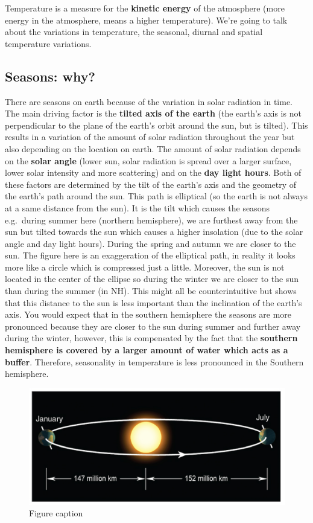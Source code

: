 \documentclass[oneside]{book}
\begin{document}
Temperature is a measure for the \textbf{kinetic energy} of the
atmosphere (more energy in the atmosphere, means a higher temperature).
We're going to talk about the variations in temperature, the seasonal,
diurnal and spatial temperature variations.

\subsection{Seasons: why?}\label{seasons-why}

There are seasons on earth because of the variation in solar radiation
in time. The main driving factor is the \textbf{tilted axis of the
earth} (the earth's axis is not perpendicular to the plane of the
earth's orbit around the sun, but is tilted). This results in a
variation of the amount of solar radiation throughout the year but also
depending on the location on earth. The amount of solar radiation
depends on the \textbf{solar angle} (lower sun, solar radiation is
spread over a larger surface, lower solar intensity and more scattering)
and on the \textbf{day light hours}. Both of these factors are
determined by the tilt of the earth's axis and the geometry of the
earth's path around the sun. This path is elliptical (so the earth is
not always at a same distance from the sun). It is the tilt which causes
the seasons e.g.~during summer here (northern hemisphere), we are
furthest away from the sun but tilted towards the sun which causes a
higher insolation (due to the solar angle and day light hours). During
the spring and autumn we are closer to the sun. The figure here is an
exaggeration of the elliptical path, in reality it looks more like a
circle which is compressed just a little. Moreover, the sun is not
located in the center of the ellipse so during the winter we are closer
to the sun than during the summer (in NH). This might all be
counterintuitive but shows that this distance to the sun is less
important than the inclination of the earth's axis. You would expect
that in the southern hemisphere the seasons are more pronounced because
they are closer to the sun during summer and further away during the
winter, however, this is compensated by the fact that the
\textbf{southern hemisphere is covered by a larger amount of water which
acts as a buffer}. Therefore, seasonality in temperature is less
pronounced in the Southern hemisphere.

\begin{figure}
\centering
\includegraphics{figures/Figure22.png}
\caption{\label{fig:Sun}Figure caption}
\end{figure}
\end{document}
